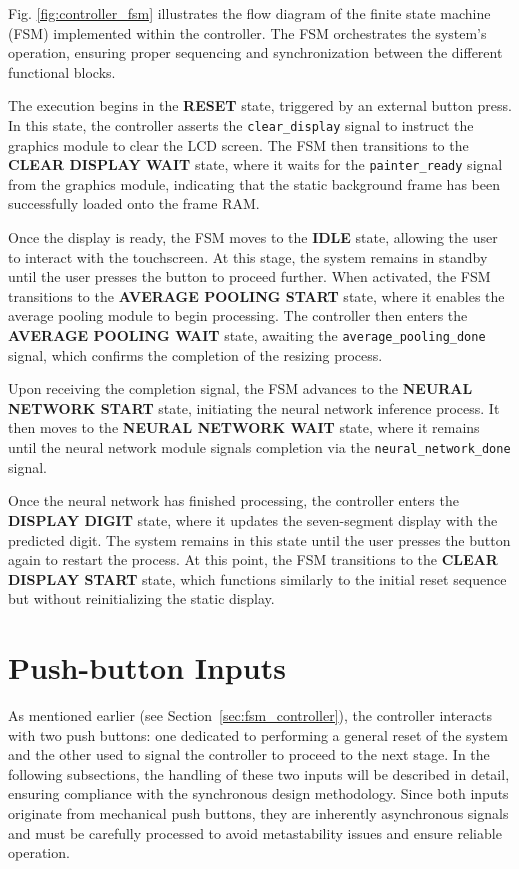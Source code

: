 \documentclass[11pt]{report}
\begin{document}
Fig. \ref{fig:controller_fsm} illustrates the flow diagram of the finite state machine (FSM) implemented within the controller. The FSM orchestrates the system's operation, ensuring proper sequencing and synchronization between the different functional blocks.

The execution begins in the \textbf{RESET} state, triggered by an external button press. In this state, the controller asserts the \texttt{clear\_display} signal to instruct the graphics module to clear the LCD screen. The FSM then transitions to the \textbf{CLEAR DISPLAY WAIT} state, where it waits for the \texttt{painter\_ready} signal from the graphics module, indicating that the static background frame has been successfully loaded onto the frame RAM.

Once the display is ready, the FSM moves to the \textbf{IDLE} state, allowing the user to interact with the touchscreen. At this stage, the system remains in standby until the user presses the button to proceed further. When activated, the FSM transitions to the \textbf{AVERAGE POOLING START} state, where it enables the average pooling module to begin processing. The controller then enters the \textbf{AVERAGE POOLING WAIT} state, awaiting the \texttt{average\_pooling\_done} signal, which confirms the completion of the resizing process.

Upon receiving the completion signal, the FSM advances to the \textbf{NEURAL NETWORK START} state, initiating the neural network inference process. It then moves to the \textbf{NEURAL NETWORK WAIT} state, where it remains until the neural network module signals completion via the \texttt{neural\_network\_done} signal.

Once the neural network has finished processing, the controller enters the \textbf{DISPLAY DIGIT} state, where it updates the seven-segment display with the predicted digit. The system remains in this state until the user presses the button again to restart the process. At this point, the FSM transitions to the \textbf{CLEAR DISPLAY START} state, which functions similarly to the initial reset sequence but without reinitializing the static display.

\section{Push-button Inputs}
\label{sec:push-button_inputs}

As mentioned earlier (see Section~\ref{sec:fsm_controller}), the controller interacts with two push buttons: one dedicated to performing a general reset of the system and the other used to signal the controller to proceed to the next stage. In the following subsections, the handling of these two inputs will be described in detail, ensuring compliance with the synchronous design methodology. Since both inputs originate from mechanical push buttons, they are inherently asynchronous signals and must be carefully processed to avoid metastability issues and ensure reliable operation.  
\end{document}
